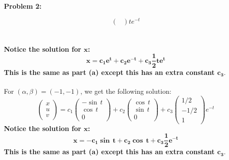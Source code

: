 \documentclass[11pt]{article}
\newenvironment{problem}[1]{\textbf{Problem #1: }}{\newpage}
\begin{document}
\begin{problem}{2}
\begin{enumerate}[label = (\alph*)]
\[\begin{pmatrix}
			\end{pmatrix}te^{-t} \]
			\\ \\
			\textbf{Notice the solution for $\boldsymbol{x}$:}
			\[\boldsymbol{x = c_1e^t + c_2e^{-t} + c_3\frac{1}{2}te^{t}}\]
			\textbf{This is the same as part (a) except this has an extra constant $\boldsymbol{c_3}$}. 
			\\ \\
			For $(\alpha,\beta) = (-1,-1)$, we get the following solution:
			\[\begin{pmatrix}
				x \\ u \\ v
			\end{pmatrix} = c_1\begin{pmatrix}
				-\sin\,t \\ \cos\,t \\ 0
			\end{pmatrix} + c_2\begin{pmatrix}
				\cos\,t \\ \sin\,t \\ 0
			\end{pmatrix} + c_3\begin{pmatrix}
				1/2 \\ -1/2 \\ 1
			\end{pmatrix}e^{-t}\]
			\textbf{Notice the solution for $\boldsymbol{x}$:}
			\[\boldsymbol{x = -c_1\sin\,t + c_2\cos\,t + c_3\frac{1}{2}e^{-t}}\]
			\textbf{This is the same as part (a) except this has an extra constant $\boldsymbol{c_3}$}.
		\end{enumerate}
	\end{problem}
\end{document}

